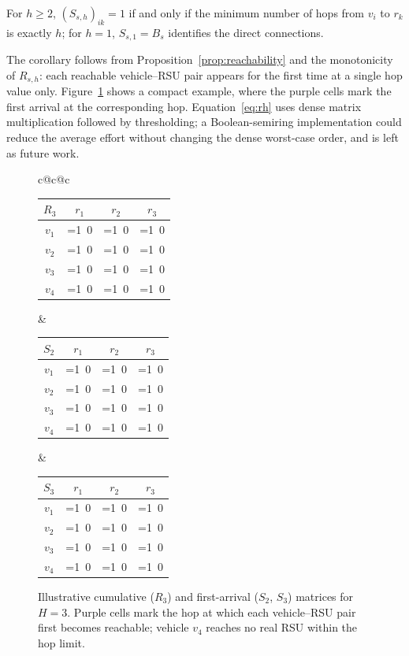 \documentclass[engproc,proceedingpaper,submit,oneauthor]{Definitions/mdpi}
\newcommand{\added}[1]{#1}
\begin{document}
\begin{Corollary}\label{cor:minhop}
For $h\ge 2$, $(S_{s,h})_{ik}=1$ if and only if the minimum number of hops from $v_i$
to $r_k$ is exactly $h$; for $h=1$, $S_{s,1}=B_s$ identifies the direct connections.
\end{Corollary}

The corollary follows from Proposition~\ref{prop:reachability} and the monotonicity of
$R_{s,h}$: each reachable vehicle--RSU pair appears for the first time at a single hop
value only. Figure~\ref{fig:matrices} shows a compact example, where the purple cells
mark the first arrival at the corresponding hop. \added{Equation~\eqref{eq:rh} uses
dense matrix multiplication followed by thresholding; a Boolean-semiring implementation
could reduce the average effort without changing the dense worst-case order, and is
left as future work.}

\begin{figure}[H]
\centering
\newcommand{\hc}[1]{\ifnum#1=1\cellcolor{violet!60}\textcolor{white}{1}\else\cellcolor{gray!8}0\fi}
\small
\begin{tabular}{c@{\hskip 6mm}c@{\hskip 6mm}c}
\begin{tabular}{c|ccc}
$R_3$ & $r_1$ & $r_2$ & $r_3$\\\hline
$v_1$ & \hc1 & \hc1 & \hc1\\
$v_2$ & \hc1 & \hc1 & \hc1\\
$v_3$ & \hc1 & \hc1 & \hc1\\
$v_4$ & \hc0 & \hc0 & \hc0
\end{tabular}&
\begin{tabular}{c|ccc}
$S_2$ & $r_1$ & $r_2$ & $r_3$\\\hline
$v_1$ & \hc0 & \hc0 & \hc1\\
$v_2$ & \hc1 & \hc1 & \hc0\\
$v_3$ & \hc0 & \hc0 & \hc1\\
$v_4$ & \hc0 & \hc0 & \hc0
\end{tabular}&
\begin{tabular}{c|ccc}
$S_3$ & $r_1$ & $r_2$ & $r_3$\\\hline
$v_1$ & \hc0 & \hc1 & \hc0\\
$v_2$ & \hc0 & \hc0 & \hc0\\
$v_3$ & \hc1 & \hc0 & \hc0\\
$v_4$ & \hc0 & \hc0 & \hc0
\end{tabular}
\end{tabular}
\caption{Illustrative cumulative ($R_3$) and first-arrival ($S_2$, $S_3$) matrices for
$H=3$. Purple cells mark the hop at which each vehicle--RSU pair first becomes
reachable; vehicle $v_4$ reaches no real RSU within the hop limit.}\label{fig:matrices}
\end{figure}
\end{document}
